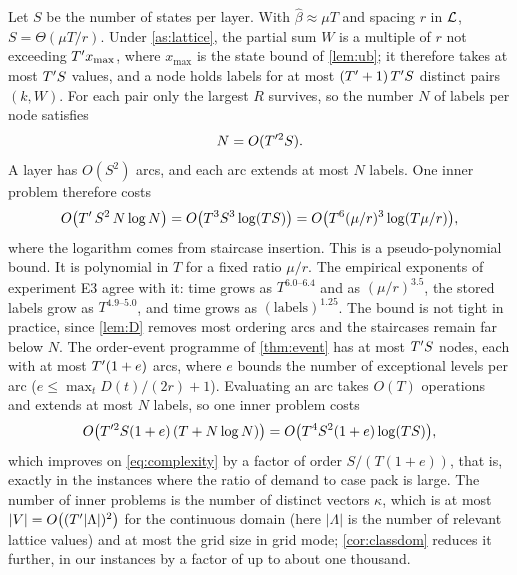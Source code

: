 Let $S$ be the number of states per layer. With $\hat\beta\approx\mu T$ and spacing $r$
in $\mathcal{L}$, $S=\Theta(\mu T/r)$. Under \cref{as:lattice}, the partial sum $W$ is a multiple
of $r$ not exceeding $T' x_{\max}$, where $x_{\max}$ is the state bound of \cref{lem:ub};
it therefore takes at most $T' S$ values, and a node holds labels for at most
$(T'+1)\,T' S$ distinct pairs $(k,W)$. For each pair only the largest $R$ survives, so
the number $N$ of labels per node satisfies
\begin{equation}
  N=O(T'^{2}S).
\end{equation}
A layer has $O(S^2)$ arcs, and each arc extends at most $N$ labels. One inner
problem therefore costs
\begin{equation}\label{eq:complexity}
  O\bigl(T'\,S^{2}\,N\log N\bigr)
  =O\bigl(T^{3}S^{3}\log(TS)\bigr)
  =O\bigl(T^{6}(\mu/r)^{3}\log(T\mu/r)\bigr),
\end{equation}
where the logarithm comes from staircase insertion. This is a pseudo-polynomial bound. It
is polynomial in $T$ for a fixed ratio $\mu/r$. The empirical exponents of experiment E3
agree with it: time grows as $T^{6.0\text{--}6.4}$ and as $(\mu/r)^{3.5}$, the stored
labels grow as $T^{4.9\text{--}5.0}$, and time grows as $(\text{labels})^{1.25}$. The
bound is not tight in practice, since \cref{lem:D} removes most ordering arcs and the
staircases remain far below $N$. The order-event programme of \cref{thm:event} has at most $T' S$ nodes, each with at
most $T'(1+e)$ arcs, where $e$ bounds the number of exceptional levels per arc
($e\le\max_t D(t)/(2r)+1$). Evaluating an arc takes $O(T)$ operations and extends at most
$N$ labels, so one inner problem costs
\begin{equation}\label{eq:complexity-event}
  O\bigl(T'^{2}S(1+e)\,(T+N\log N)\bigr)=O\bigl(T^{4}S^{2}(1+e)\log(TS)\bigr),
\end{equation}
which improves on \eqref{eq:complexity} by a factor of order $S/(T(1+e))$, that is, exactly
in the instances where the ratio of demand to case pack is large. The number of inner problems is the number of
distinct vectors $\kappa$, which is at most $\lvert V\rvert=O\bigl((T'\lvert\Lambda\rvert)^2\bigr)$
for the continuous domain (here $\lvert\Lambda\rvert$ is the number of relevant lattice
values) and at most the grid size in grid mode; \cref{cor:classdom} reduces it further, in our
instances by a factor of up to about one thousand.

